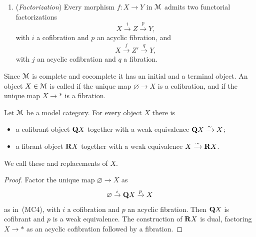 \begin{definition}
\begin{enumerate}
\begin{equation}
\begin{tikzcd}[ampersand replacement=\&]
            \\
            B \&\& Y
            \arrow[from=1-1, to=1-3]
            \arrow["i"', from=1-1, to=3-1]
            \arrow["p", from=1-3, to=3-3]
            \arrow[from=3-1, to=3-3]
            \arrow[dashed, from=3-1, to=1-3]
        \end{tikzcd}
      \end{equation}
      admits a dashed diagonal lift.  Dually for trivial cofibrations and
      fibrations.
    \item[(MC4)] (\emph{Factorization}) Every morphism $f \colon X \to Y$ in
      $\mathcal M$ admits two functorial factorizations
      \begin{equation}
        X \xrightarrow{i} Z \xrightarrow{p} Y,
      \end{equation}
      with $i$ a cofibration and $p$ an acyclic fibration, and
      \begin{equation}
        X \xrightarrow{j} Z' \xrightarrow{q} Y,
      \end{equation}
      with $j$ an acyclic cofibration and $q$ a fibration.
  \end{enumerate}
  Since $\mathcal M$ is complete and cocomplete it has an initial and a terminal
  object.  An object $X \in \mathcal M$ is called  if the unique map
  $\varnothing \to X$ is a cofibration, and  if the unique map
  $X \to *$ is a fibration.
\end{definition}

\begin{lemma}\label{ch2:: lem: fibrant-cofibrant}
    Let $\mathcal M$ be a model category. For every object $X$ there is
    \begin{itemize}
      \item a cofibrant object $\mathbf Q X$ together with a weak equivalence
        $\mathbf Q X \xrightarrow{\sim} X$;
      \item a fibrant object $\mathbf R X$ together with a weak equivalence
        $X \xrightarrow{\sim} \mathbf R X$.
    \end{itemize}
    We call these  and  replacements of $X$.
\end{lemma}

\begin{proof}
    Factor the unique map $\varnothing \to X$ as
    \begin{equation}
        \varnothing \xrightarrow{i} \mathbf Q X \xrightarrow{p} X
    \end{equation}
    as in~\textup{(MC4)}, with $i$ a cofibration and $p$ an acyclic fibration.
    Then $\mathbf Q X$ is cofibrant and $p$ is a weak equivalence.  The construction
    of $\mathbf R X$ is dual, factoring $X \to *$ as an acyclic cofibration followed
    by a fibration.
\end{proof}

